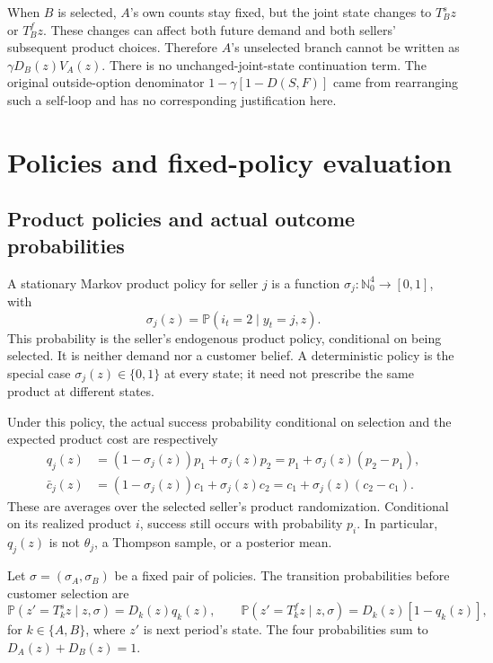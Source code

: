 \documentclass[11pt]{article}
\newcommand{\Pb}{\mathbb P}
\begin{document}
When $B$ is selected, $A$'s own counts stay fixed, but the joint state
changes to $T_B^s z$ or $T_B^f z$. These changes can affect both future
demand and both sellers' subsequent product choices. Therefore $A$'s
unselected branch cannot be written as $\gamma D_B(z)V_A(z)$.
There is no unchanged-joint-state continuation term. The original
outside-option denominator $1-\gamma[1-D(S,F)]$ came from rearranging
such a self-loop and has no corresponding justification here.

\section{Policies and fixed-policy evaluation}

\subsection{Product policies and actual outcome probabilities}

A stationary Markov product policy for seller $j$ is a function
$\sigma_j:\mathbb N_0^4\to[0,1]$, with
\begin{equation}\label{eq:policy}
\sigma_j(z)=\Pb(i_t=2\mid y_t=j,z).
\end{equation}
This probability is the seller's endogenous product policy, conditional
on being selected. It is neither demand nor a customer belief.
A deterministic policy is the special case $\sigma_j(z)\in\{0,1\}$
at every state; it need not prescribe the same product at different states.

Under this policy, the actual success probability conditional on selection
and the expected product cost are respectively
\begin{equation}\label{eq:policy-outcomes}
\begin{aligned}
q_j(z)&=(1-\sigma_j(z))p_1+\sigma_j(z)p_2
       =p_1+\sigma_j(z)(p_2-p_1),\\
\bar c_j(z)&=(1-\sigma_j(z))c_1+\sigma_j(z)c_2
       =c_1+\sigma_j(z)(c_2-c_1).
\end{aligned}
\end{equation}
These are averages over the selected seller's product randomization.
Conditional on its realized product $i$, success still occurs with
probability $p_i$. In particular, $q_j(z)$ is not $\theta_j$, a Thompson
sample, or a posterior mean.

Let $\sigma=(\sigma_A,\sigma_B)$ be a fixed pair of policies. The
transition probabilities before customer selection are
\begin{equation}\label{eq:transition-probabilities}
\Pb(z'=T_k^s z\mid z,\sigma)=D_k(z)q_k(z),\qquad
\Pb(z'=T_k^f z\mid z,\sigma)=D_k(z)[1-q_k(z)],
\end{equation}
for $k\in\{A,B\}$, where $z'$ is next period's state. The four
probabilities sum to $D_A(z)+D_B(z)=1$.
\end{document}
